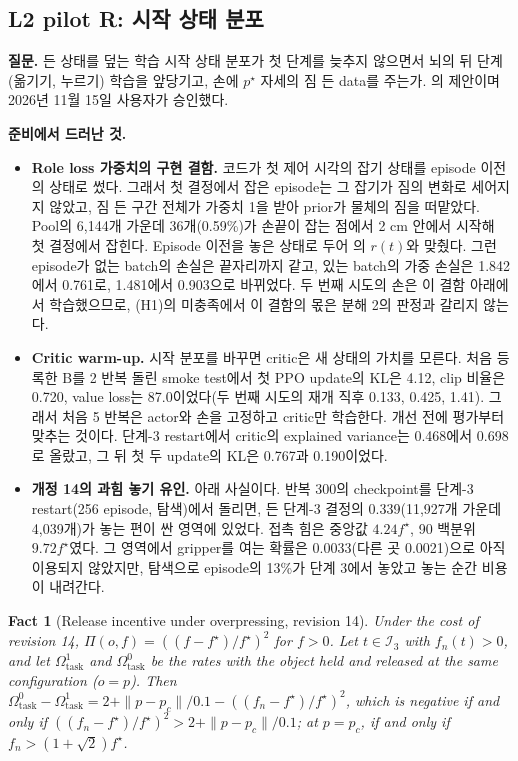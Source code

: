 \documentclass[11pt]{article}\usepackage[margin=1in]{geometry}\usepackage{amsmath,amssymb,amsthm,mathtools}\usepackage{graphicx}\graphicspath{{figures/}{../figures/}{figs/}{./}}\usepackage{enumitem}\usepackage{hyperref}\usepackage{cleveref}\usepackage{tikz}\usetikzlibrary{arrows.meta,positioning,calc,shapes.geometric}\usepackage{float}\usepackage{rotating}\usepackage[most]{tcolorbox}\usepackage{kotex}\usepackage{booktabs}\usepackage{longtable}\emergencystretch=1.6em\tolerance=2000 \crefname{assumption}{Assumption}{Assumptions}\Crefname{assumption}{Assumption}{Assumptions}\crefname{definition}{Definition}{Definitions}\Crefname{definition}{Definition}{Definitions}\crefname{proposition}{Proposition}{Propositions}\Crefname{proposition}{Proposition}{Propositions}\crefname{fact}{Fact}{Facts}\Crefname{fact}{Fact}{Facts} \newtheorem{assumption}{Assumption}\newtheorem{definition}{Definition}\newtheorem{lemma}{Lemma}\newtheorem{proposition}{Proposition}\newtheorem{theorem}{Theorem}\newtheorem{corollary}{Corollary}\newtheorem{fact}{Fact}\theoremstyle{remark}\newtheorem{remark}{Remark} \newcommand{\R}{\mathbb{R}}\newcommand{\xb}{\bar x}\newcommand{\Ab}{\bar A}\newcommand{\By}{\bar B_y}\newcommand{\U}{\mathcal U}\newcommand{\Z}{\mathcal Z}
\begin{document}
\subsection{L2 pilot R: 시작 상태 분포}
\label{sec:l2pr}

\textbf{질문.} 든 상태를 덮는 학습 시작 상태 분포가 첫 단계를 늦추지 않으면서 뇌의 뒤 단계(옮기기, 누르기) 학습을 앞당기고, 손에 $p^\star$ 자세의 짐 든 data를 주는가. 의 제안이며 2026년 11월 15일 사용자가 승인했다.

\textbf{준비에서 드러난 것.}
\begin{itemize}
\item \textbf{Role loss 가중치의 구현 결함.} 코드가 첫 제어 시각의 잡기 상태를 episode 이전의 상태로 썼다. 그래서 첫 결정에서 잡은 episode는 그 잡기가 짐의 변화로 세어지지 않았고, 짐 든 구간 전체가 가중치 1을 받아 prior가 물체의 짐을 떠맡았다. Pool의 6{,}144개 가운데 36개(0.59\%)가 손끝이 잡는 점에서 2 cm 안에서 시작해 첫 결정에서 잡힌다. Episode 이전을 놓은 상태로 두어 의 $r(t)$와 맞췄다. 그런 episode가 없는 batch의 손실은 끝자리까지 같고, 있는 batch의 가중 손실은 1.842에서 0.761로, 1.481에서 0.903으로 바뀌었다. 두 번째 시도의 손은 이 결함 아래에서 학습했으므로, (H1)의 미충족에서 이 결함의 몫은 분해 2의 판정과 갈리지 않는다.
\item \textbf{Critic warm-up.} 시작 분포를 바꾸면 critic은 새 상태의 가치를 모른다. 처음 등록한 B를 2 반복 돌린 smoke test에서 첫 PPO update의 KL은 4.12, clip 비율은 0.720, value loss는 87.0이었다(두 번째 시도의 재개 직후 0.133, 0.425, 1.41). 그래서 처음 5 반복은 actor와 손을 고정하고 critic만 학습한다. 개선 전에 평가부터 맞추는 것이다. 단계-3 restart에서 critic의 explained variance는 0.468에서 0.698로 올랐고, 그 뒤 첫 두 update의 KL은 0.767과 0.190이었다.
\item \textbf{개정 14의 과힘 놓기 유인.} 아래 사실이다. 반복 300의 checkpoint를 단계-3 restart(256 episode, 탐색)에서 돌리면, 든 단계-3 결정의 0.339(11{,}927개 가운데 4{,}039개)가 놓는 편이 싼 영역에 있었다. 접촉 힘은 중앙값 $4.24f^\star$, 90 백분위 $9.72f^\star$였다. 그 영역에서 gripper를 여는 확률은 0.0033(다른 곳 0.0021)으로 아직 이용되지 않았지만, 탐색으로 episode의 13\%가 단계 3에서 놓았고 놓는 순간 비용이 내려간다.
\end{itemize}

\begin{fact}[Release incentive under overpressing, revision 14]
\label{fact:release14}
Under the cost of revision 14, $\Pi(o,f)=((f-f^\star)/f^\star)^2$ for $f>0$. Let $t\in\mathcal I_3$ with $f_n(t)>0$, and let $\Omega^1_{\mathrm{task}}$ and $\Omega^0_{\mathrm{task}}$ be the rates with the object held and released at the same configuration ($o=p$). Then $\Omega^0_{\mathrm{task}}-\Omega^1_{\mathrm{task}}=2+\|p-p_c\|/0.1-((f_n-f^\star)/f^\star)^2$, which is negative if and only if $((f_n-f^\star)/f^\star)^2>2+\|p-p_c\|/0.1$; at $p=p_c$, if and only if $f_n>(1+\sqrt2)f^\star$.
\end{fact}
\end{document}

